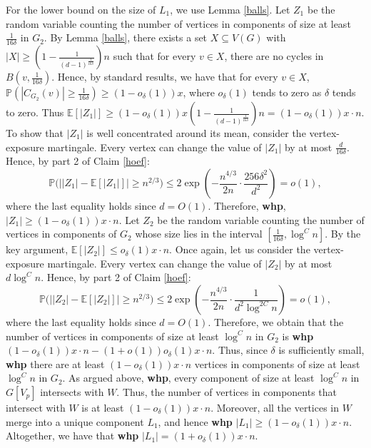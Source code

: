 \documentclass[notitlepage]{scrartcl}
\begin{document}
For the lower bound on the size of $L_1$, we use Lemma \ref{balls}.
Let $Z_1$ be the random variable counting the number of vertices in components of size at least $\frac{1}{16\delta}$ in $G_2$. By Lemma \ref{balls}, there exists a set $X \subseteq V(G)$ with $|X|\geq \left(1-\frac{1}{(d-1)^{\frac{1}{16\delta}}}\right)n$ such that for every $v \in X$, there are no cycles in $B\left(v,\frac{1}{16\delta}\right)$. Hence, by standard results, we have that for every $v\in X$, $\mathbb{P}(|C_{G_2}(v)|\geq \frac{1}{16\delta})\geq (1-o_\delta(1))x$, where $o_\delta(1)$ tends to zero as $\delta$ tends to zero. Thus $\mathbb{E}\left[|Z_1|\right]\geq (1-o_\delta(1)) x \left(1-\frac{1}{(d-1)^{\frac{1}{16\delta}}}\right)n=(1-o_\delta(1))x\cdot n$. To show that $|Z_1|$ is well concentrated around its mean, consider the vertex-exposure martingale. Every vertex can change the value of $|Z_1|$ by at most $\frac{d}{16\delta}$. Hence, by part 2 of Claim \ref{hoef}:
$$\mathbb{P}\bigg(\Big||Z_1|-\mathbb{E}[|Z_1|]\Big|\geq n^{2/3}\bigg)\leq 2\exp \left(-\frac{n^{4/3}}{2n}\cdot\frac{256\delta^2}{d^2}\right)=o(1),$$
where the last equality holds since $d=O(1)$.
Therefore, \textbf{whp}, $|Z_1|\geq (1-o_\delta(1))x\cdot n$.
Let $Z_2$ be the random variable counting the number of vertices in components of $G_2$ whose size lies in the interval $\left[\frac{1}{16\delta}, \log^C n\right]$. By the key argument, $\mathbb{E}[|Z_2|]\le o_\delta(1)x\cdot n$. Once again, let us consider the vertex-exposure martingale. Every vertex can change the value of $|Z_2|$ by at most $d\log^C n$. Hence, by part 2 of Claim \ref{hoef}:
$$\mathbb{P}\bigg(\Big||Z_2|-\mathbb{E}[|Z_2|]\Big|\geq n^{2/3}\bigg)\leq 2\exp \left(-\frac{n^{4/3}}{2n}\cdot\frac{1}{d^2\log^{2C} n}\right)=o(1),$$
where the last equality holds since $d=O(1)$. Therefore, we obtain that the number of vertices in components of size at least $\log^C n$ in $G_2$ is \textbf{whp} $(1-o_\delta(1))x\cdot n-(1+o(1))o_\delta(1)x\cdot n$.
Thus, since $\delta$ is sufficiently small, \textbf{whp} there are at least $(1-o_\delta(1))x\cdot n$ vertices in components of size at least $\log^C n$ in $G_2$. As argued above, \textbf{whp}, every component of size at least $\log^C n$ in $G[V_p]$ intersects with $W$. Thus, the number of vertices in components that intersect with $W$ is at least $(1-o_\delta(1))x\cdot n$. Moreover, all the vertices in $W$ merge into a unique component $L_1$, and hence \textbf{whp} $|L_1|\ge (1-o_\delta(1))x\cdot n$. Altogether, we have that \textbf{whp} $|L_1|=(1+o_\delta(1))x\cdot n$.
\end{document}
